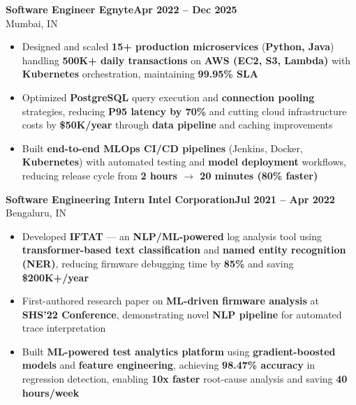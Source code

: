 \documentclass[10pt,a4paper]{article}
\begin{document}
{\vspace{2pt}
\noindent
\textbf{Software Engineer \textbf{\textbar{}} Egnyte}\hfill\textbf{Apr 2022 -- Dec 2025}\\[-2pt]
{\small Mumbai, IN}
\begin{itemize}[leftmargin=0.3in, itemsep=1.5pt, topsep=0pt, parsep=0pt, partopsep=0pt, label=$\circ$]
    \item Designed and scaled \textbf{15+ production microservices} (\textbf{Python, Java}) handling \textbf{500K+ daily transactions} on \textbf{AWS (EC2, S3, Lambda)} with \textbf{Kubernetes} orchestration, maintaining \textbf{99.95\% SLA}
    \item Optimized \textbf{PostgreSQL} query execution and \textbf{connection pooling} strategies, reducing \textbf{P95 latency by 70\%} and cutting cloud infrastructure costs by \textbf{\$50K/year} through \textbf{data pipeline} and caching improvements
    \item Built \textbf{end-to-end MLOps CI/CD pipelines} (Jenkins, Docker, \textbf{Kubernetes}) with automated testing and \textbf{model deployment} workflows, reducing release cycle from \textbf{2 hours $\rightarrow$ 20 minutes (80\% faster)}
\end{itemize}

\vspace{2pt}
\noindent
\textbf{Software Engineering Intern \textbf{\textbar{}} Intel Corporation}\hfill\textbf{Jul 2021 -- Apr 2022}\\[-2pt]
{\small Bengaluru, IN}
\begin{itemize}[leftmargin=0.3in, itemsep=1.5pt, topsep=0pt, parsep=0pt, partopsep=0pt, label=$\circ$]
    \item Developed \textbf{IFTAT} --- an \textbf{NLP/ML-powered} log analysis tool using \textbf{transformer-based text classification} and \textbf{named entity recognition (NER)}, reducing firmware debugging time by \textbf{85\%} and saving \textbf{\$200K+/year}
    \item First-authored research paper on \textbf{ML-driven firmware analysis} at \textbf{SHS'22 Conference}, demonstrating novel \textbf{NLP pipeline} for automated trace interpretation
    \item Built \textbf{ML-powered test analytics platform} using \textbf{gradient-boosted models} and \textbf{feature engineering}, achieving \textbf{98.47\% accuracy} in regression detection, enabling \textbf{10x faster} root-cause analysis and saving \textbf{40 hours/week}
\end{itemize}
}
\end{document}
